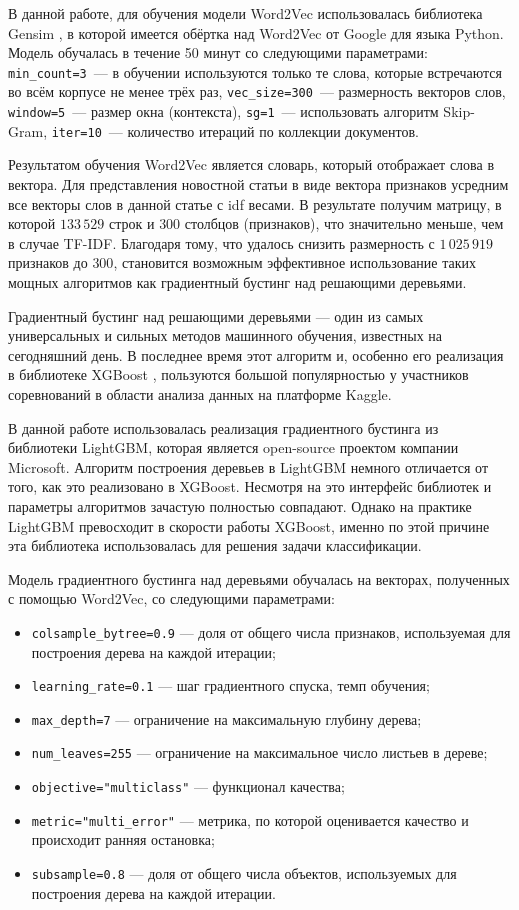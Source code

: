 \documentclass[a4paper, 14pt]{extarticle}
\begin{document}
В данной работе, для обучения модели Word2Vec использовалась библиотека Gensim \cite{rehurek_lrec}, в которой имеется обёртка над 
Word2Vec от Google  для языка Python. Модель обучалась в течение 50 минут со следующими параметрами: \verb|min_count=3|~--- в 
обучении используются только те слова,  которые встречаются во всём корпусе не менее трёх раз, \verb|vec_size=300|~--- размерность 
векторов слов, \verb|window=5|~--- размер окна (контекста), \verb|sg=1|~--- использовать алгоритм Skip-Gram, \verb|iter=10|~--- 
количество итераций по коллекции документов.

Результатом обучения Word2Vec является словарь, который отображает слова в вектора. Для представления новостной статьи в виде 
вектора признаков усредним все векторы слов в данной статье с idf весами. В результате получим матрицу, в которой $133\,529$ строк 
и $300$ столбцов (признаков), что значительно меньше, чем в случае TF-IDF. Благодаря тому, что удалось снизить размерность с 
$1\,025\,919$ признаков до $300$, становится возможным эффективное использование таких мощных алгоритмов как градиентный бустинг 
над решающими деревьями.

Градиентный бустинг над решающими деревьями --- один из самых универсальных и сильных методов машинного обучения, известных
на сегодняшний день. В последнее время этот алгоритм и, особенно его реализация в библиотеке XGBoost 
\cite{DBLP:journals/corr/ChenG16}, пользуются большой популярностью у участников соревнований в области анализа данных на платформе 
Kaggle.

В данной работе использовалась реализация градиентного бустинга из библиотеки LightGBM, которая является open-source проектом компании
Microsoft. Алгоритм построения деревьев в LightGBM немного отличается от того, как это реализовано в XGBoost. Несмотря на это интерфейс библиотек
и параметры алгоритмов зачастую полностью совпадают. Однако на практике LightGBM превосходит в скорости работы XGBoost, именно по этой причине
эта библиотека использовалась для решения задачи классификации.

Модель градиентного бустинга над деревьями обучалась на векторах, полученных с помощью Word2Vec, со следующими параметрами:
\begin{itemize}
	\item \verb|colsample_bytree=0.9| --- доля от общего числа признаков, используемая для построения дерева на каждой итерации;
	\item \verb|learning_rate=0.1| --- шаг градиентного спуска, темп обучения;
	\item \verb|max_depth=7| --- ограничение на максимальную глубину дерева;
	\item \verb|num_leaves=255| --- ограничение на максимальное число листьев в дереве;
	\item \verb|objective="multiclass"| --- функционал качества;
	\item \verb|metric="multi_error"| --- метрика, по которой оценивается качество и происходит ранняя остановка;
	\item \verb|subsample=0.8| --- доля от общего числа объектов, используемых для построения дерева на каждой итерации.
\end{itemize}
\end{document}
